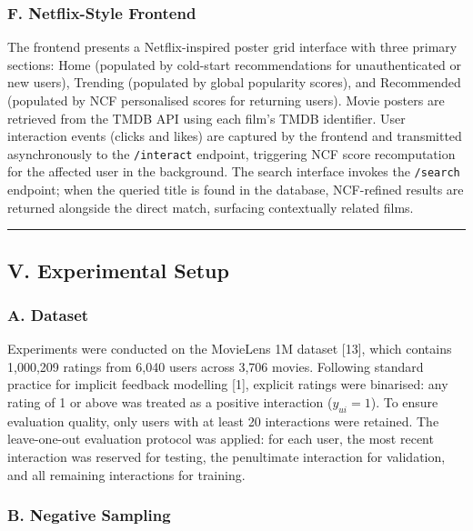 \documentclass[
]{IEEEtran}
\begin{document}
\subsubsection{F. Netflix-Style
Frontend}\label{f.-netflix-style-frontend}

The frontend presents a Netflix-inspired poster grid interface with
three primary sections: Home (populated by cold-start recommendations
for unauthenticated or new users), Trending (populated by global
popularity scores), and Recommended (populated by NCF personalised
scores for returning users). Movie posters are retrieved from the TMDB
API using each film's TMDB identifier. User interaction events (clicks
and likes) are captured by the frontend and transmitted asynchronously
to the \texttt{/interact} endpoint, triggering NCF score recomputation
for the affected user in the background. The search interface invokes
the \texttt{/search} endpoint; when the queried title is found in the
database, NCF-refined results are returned alongside the direct match,
surfacing contextually related films.

\begin{center}\rule{0.5\linewidth}{0.5pt}\end{center}

\subsection{V. Experimental Setup}\label{v.-experimental-setup}

\subsubsection{A. Dataset}\label{a.-dataset}

Experiments were conducted on the MovieLens 1M dataset {[}13{]}, which
contains 1,000,209 ratings from 6,040 users across 3,706 movies.
Following standard practice for implicit feedback modelling {[}1{]},
explicit ratings were binarised: any rating of 1 or above was treated as
a positive interaction (\(y_{ui} = 1\)). To ensure evaluation quality,
only users with at least 20 interactions were retained. The
leave-one-out evaluation protocol was applied: for each user, the most
recent interaction was reserved for testing, the penultimate interaction
for validation, and all remaining interactions for training.

\subsubsection{B. Negative Sampling}\label{b.-negative-sampling}
\end{document}
